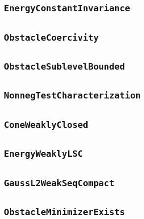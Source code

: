 \documentclass[11pt]{amsart}
\theoremstyle{definition}
\begin{document}
\subsection{\texorpdfstring{\texttt{EnergyConstantInvariance}}{EnergyConstantInvariance}}\label{node:EnergyConstantInvariance}


\subsection{\texorpdfstring{\texttt{ObstacleCoercivity}}{ObstacleCoercivity}}\label{node:ObstacleCoercivity}


\subsection{\texorpdfstring{\texttt{ObstacleSublevelBounded}}{ObstacleSublevelBounded}}\label{node:ObstacleSublevelBounded}


\subsection{\texorpdfstring{\texttt{NonnegTestCharacterization}}{NonnegTestCharacterization}}\label{node:NonnegTestCharacterization}


\subsection{\texorpdfstring{\texttt{ConeWeaklyClosed}}{ConeWeaklyClosed}}\label{node:ConeWeaklyClosed}


\subsection{\texorpdfstring{\texttt{EnergyWeaklyLSC}}{EnergyWeaklyLSC}}\label{node:EnergyWeaklyLSC}


\subsection{\texorpdfstring{\texttt{GaussL2WeakSeqCompact}}{GaussL2WeakSeqCompact}}\label{node:GaussL2WeakSeqCompact}


\subsection{\texorpdfstring{\texttt{ObstacleMinimizerExists}}{ObstacleMinimizerExists}}\label{node:ObstacleMinimizerExists}

\end{document}
